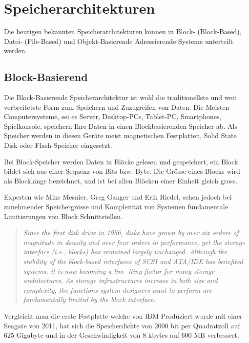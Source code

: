 \cleardoublepage
\chapter{Speicherarchitekturen}

Die heutigen bekannten Speicherarchitekturen können in Block- (Block-Based), Datei- (File-Based) und Objekt-Basierende Adressierende Systeme unterteilt werden.


\section{Block-Basierend}
Die Block-Basierende Speicherarchitektur ist wohl die traditionellste und weit verbreitetste Form zum Speichern und Zuzugreifen von Daten. Die Meisten Computersysteme, sei es Server, Desktop-PCs, Tablet-PC, Smartphones, Spielkonsole, speichern Ihre Daten in einen Blockbasierenden Speicher ab. Als Speicher werden in diesen Geräte meist magnetischen Festplatten, Solid State Disk oder Flash-Speicher eingesetzt.

Bei Block-Speicher werden Daten in Blöcke gelesen und gespeichert, ein Block bildet sich aus einer Sequenz von Bits bzw. Byte. Die Grösse eines Blocks wird als Blocklänge bezeichnet, und ist bei allen Blöcken einer Einheit gleich gross. 

Experten wie Mike Mesnier, Greg Ganger und Erik Riedel, sehen jedoch bei zunehmender Speichergrösse und Komplexität von Systemen fundamentale Limitierungen von Block Schnittstellen.

\begin{quotation}
\em Since the first disk drive in 1956, disks have grown by over six orders of magnitude in density and over four orders in performance, yet the storage interface (i.e., blocks) has remained largely unchanged. Although the stability of the block-based interfaces of SCSI and ATA/IDE has benefited systems, it is now becoming a lim- iting factor for many storage architectures. As storage infrastructures increase in both size and complexity, the functions system designers want to perform are fundamentally limited by the block interface. \end{quotation}\cite{Mesnier2003}

Vergleicht man die erste Festplatte welche von IBM Produziert wurde mit einer Seagate von 2011, hat sich die Speicherdichte von 2000 bit per Quadratzoll auf 625 Gigabyte  und in der Geschwindigkeit von 8 kbytes auf 600 MB verbessert.\cite{Seagate2011}\cite{Seagate2011a}


